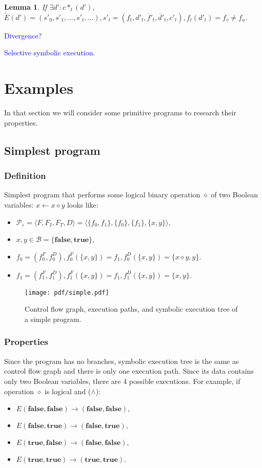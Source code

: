 \documentclass[fleqn,oneside,a4]{article}
\newcommand{\level}{\section}
\newcommand{\sublevel}{\subsection}
\newcommand{\subsublevel}{\subsubsection}
\newcommand{\comment}[1]{\textcolor{blue}{#1}}  %
\newcommand{\la}{\leftarrow}
\newcommand{\ra}{\rightarrow}
\newcommand{\true}{\textbf{true}}
\newcommand{\false}{\textbf{false}}
\newcommand{\se}{\overline}    %
\newcommand{\dse}{\widetilde}  %
\newtheorem{lemma}[theorem]{Lemma}
\begin{document}
\begin{lemma}
    If $\exists d': c*_t(d')$,
    $\dse{E}(d') = (s'_0, s'_1, \dots, s'_t, \dots),
    s'_t = (f_t, d'_t, \se{f}'_t, \se{d}'_t, c'_t),
    f_t(d'_t) = f_v \neq f_u$.
\end{lemma}

 \comment{Divergence?}

 \comment{Selective symbolic execution.}

\level{Examples}

In that section we will consider some primitive programs
to research their properties.

\sublevel{Simplest program}

\subsublevel*{Definition}

Simplest program that performs some logical binary operation $\diamond$
of two Boolean variables: $x \la x \diamond y$ looks like:
\begin{itemize}
    \item $\mathcal{P}_{\diamond} = \langle F, F_I, F_T, D \rangle =
        \langle \{f_0, f_1\}, \{f_0\}, \{f_1\}, \{x, y\} \rangle$,
    \item $x, y \in \mathcal{B} = \{\false, \true\}$,
    \item $f_0 = (f^F_0, f^D_0), f^F_0(\{x, y\}) = f_1,
        f^D_0(\{x, y\}) = \{x \diamond y, y\}$.
    \item $f_1 = (f^F_1, f^D_1), f^F_1(\{x, y\}) = f_1,
        f^D_1(\{x, y\}) = \{x, y\}$.
\end{itemize}

\begin{figure}[h!]
    \begin{center}
        \texttt{[image: pdf/simple.pdf]}
    \end{center}
    \caption{Control flow graph, execution paths,
        and symbolic execution tree of a simple program.}
\end{figure}

\subsublevel*{Properties}

Since the program has no branches, symbolic execution tree is the same as
control flow graph and there is only one execution path.
Since its data contains only two Boolean variables,
there are 4 possible executions.
For example, if operation $\diamond$ is logical and ($\land$):

\begin{itemize}
    \item $E(\false, \false) \ra (\false, \false),$
    \item $E(\false, \true) \ra (\false, \true),$
    \item $E(\true, \false) \ra (\false, \false),$
    \item $E(\true, \true) \ra (\true, \true).$
\end{itemize}
\end{document}
